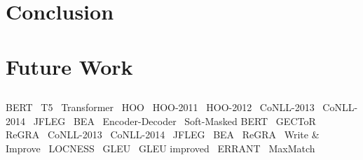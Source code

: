\documentclass{article}
\begin{document}
\section{Conclusion}

\section{Future Work}

\subsection{}

BERT~\cite{devlin2018bert}
T5~\cite{raffel2019exploring}
Transformer~\cite{vaswani2017attention}
HOO~\cite{dale2010helping}
HOO-2011~\cite{dale2011helping}
HOO-2012~\cite{dale2012hoo}
CoNLL-2013~\cite{ng-etal-2013-conll}
CoNLL-2014~\cite{ng2014conll}
JFLEG~\cite{napoles2017jfleg}
BEA~\cite{bryant2019bea}
Encoder-Decoder~\cite{kaneko2020encoder}
Soft-Masked BERT~\cite{zhang2020spelling}
GECToR~\cite{omelianchuk2020gector}
ReGRA~\cite{nunes2000processo}
CoNLL-2013~\cite{ng-etal-2013-conll}
CoNLL-2014~\cite{ng2014conll}
JFLEG~\cite{napoles2017jfleg}
BEA~\cite{bryant2019bea}
ReGRA~\cite{nunes2000processo}
Write \& Improve~\cite{yannakoudakis2018developing}
LOCNESS~\cite{granger1998computer}
GLEU~\cite{napoles2015ground}
GLEU improved~\cite{napoles2016gleu}
ERRANT~\cite{bryant-etal-2017-automatic}
MaxMatch~\cite{dahlmeier2012better}



\end{document}
